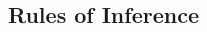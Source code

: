 \documentclass[landscape, letterpaper, 9pt]{article}
\begin{document}
\begin{multicols}{4}
    \section*{Rules of Inference}
    
\end{multicols}
\end{document}
